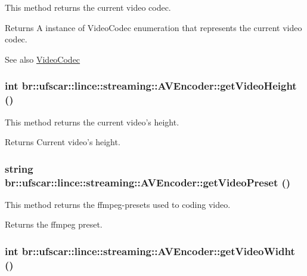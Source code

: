 This method returns the current video codec. 

\begin{DoxyReturn}{Returns}
A instance of VideoCodec enumeration that represents the current video codec. 
\end{DoxyReturn}
\begin{DoxySeeAlso}{See also}
\hyperlink{namespacebr_1_1ufscar_1_1lince_1_1streaming_ae620b1e02bc9a1ad45d6e10cd1f87693}{VideoCodec} 
\end{DoxySeeAlso}
\hypertarget{classbr_1_1ufscar_1_1lince_1_1streaming_1_1AVEncoder_a8a215c772aa7cdd6aec86537a0980e2d}{
\subsubsection[{getVideoHeight}]{\setlength{\rightskip}{0pt plus 5cm}int br::ufscar::lince::streaming::AVEncoder::getVideoHeight ()}}
\label{classbr_1_1ufscar_1_1lince_1_1streaming_1_1AVEncoder_a8a215c772aa7cdd6aec86537a0980e2d}


This method returns the current video's height. 

\begin{DoxyReturn}{Returns}
Current video's height. 
\end{DoxyReturn}
\hypertarget{classbr_1_1ufscar_1_1lince_1_1streaming_1_1AVEncoder_ae05f751735527750c3670cdb401e2180}{
\subsubsection[{getVideoPreset}]{\setlength{\rightskip}{0pt plus 5cm}string br::ufscar::lince::streaming::AVEncoder::getVideoPreset ()}}
\label{classbr_1_1ufscar_1_1lince_1_1streaming_1_1AVEncoder_ae05f751735527750c3670cdb401e2180}


This method returns the ffmpeg-\/presets used to coding video. 

\begin{DoxyReturn}{Returns}
the ffmpeg preset. 
\end{DoxyReturn}
\hypertarget{classbr_1_1ufscar_1_1lince_1_1streaming_1_1AVEncoder_a3f0b53ccd6c240ba2302c8278129f490}{
\subsubsection[{getVideoWidht}]{\setlength{\rightskip}{0pt plus 5cm}int br::ufscar::lince::streaming::AVEncoder::getVideoWidht ()}}
\label{classbr_1_1ufscar_1_1lince_1_1streaming_1_1AVEncoder_a3f0b53ccd6c240ba2302c8278129f490}


